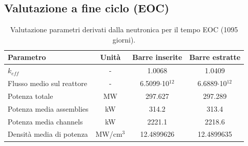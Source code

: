 \subsection{Valutazione a fine ciclo (EOC)}
\begin{table}[!htb]
\centering
 \begin{tabular}{lccc}
\toprule
Parametro & Unità & Barre inserite & Barre estratte \\
\midrule
$k_{eff}$ & - & 1.0068 & 1.0409 \\
Flusso medio sul reattore & - & 6.5099$\cdot$10$^{12}$ & 6.6889$\cdot$10$^{12}$ 
\\
Potenza totale & MW & 297.627 & 297.289 \\
Potenza media assemblies & kW & 314.2 & 313.4 \\
Potenza media channels & kW & 2221.1 & 2218.6 \\
Densità media di potenza & MW/cm$^3$ & 12.4899626 & 12.4899635 \\
\bottomrule
\end{tabular}
\caption{Valutazione parametri derivati dalla neutronica per il tempo EOC (1095 
giorni). \label{paraminseextr}}
\end{table}
